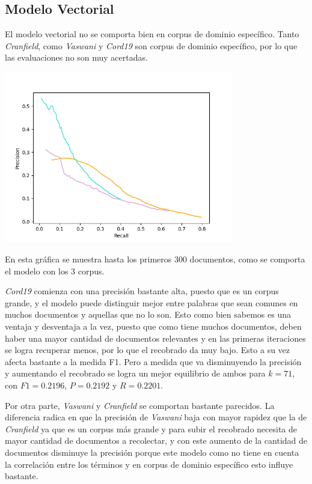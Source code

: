 \documentclass{llncs}
\begin{document}
	\subsection{Modelo Vectorial}

    El modelo vectorial no se comporta bien en corpus de dominio específico. Tanto \emph{Cranfield}, como \emph{Vaswani} y \emph{Cord19} son corpus de dominio específico, por lo que las evaluaciones no son muy acertadas.

    \begin{center}
        \includegraphics[width=10cm]{PR_plot(k=300).png}  
    \end{center}

    En esta gráfica se muestra hasta los primeros 300 documentos, como se comporta el modelo con los 3 corpus. 
        
    \emph{Cord19} comienza con una precisión bastante alta, puesto que es un corpus grande, y el modelo puede distinguir mejor entre palabras que sean comunes en muchos documentos y aquellas que no lo son. Esto como bien sabemos es una ventaja y desventaja a la vez, puesto que como tiene muchos documentos, deben haber una mayor cantidad de documentos relevantes y en las primeras iteraciones se logra recuperar menos, por lo que el recobrado da muy bajo. Esto a su vez afecta bastante a la medida F1. Pero a medida que va disminuyendo la precisión y aumentando el recobrado se logra un mejor equilibrio de ambos para $k = 71$, con $F1=0.2196$, $P=0.2192$ y $R=0.2201$.

    Por otra parte, \emph{Vaswani} y \emph{Cranfield} se comportan bastante parecidos. La diferencia radica en que la precisión de \emph{Vaswani} baja con mayor rapidez que la de \emph{Cranfield} ya que es un corpus más grande y para subir el recobrado necesita de mayor cantidad de documentos a recolectar, y con este aumento de la cantidad de documentos disminuye la precisión porque este modelo como no tiene en cuenta la correlación entre los términos y en corpus de dominio específico esto influye bastante. 
        
\end{document}
